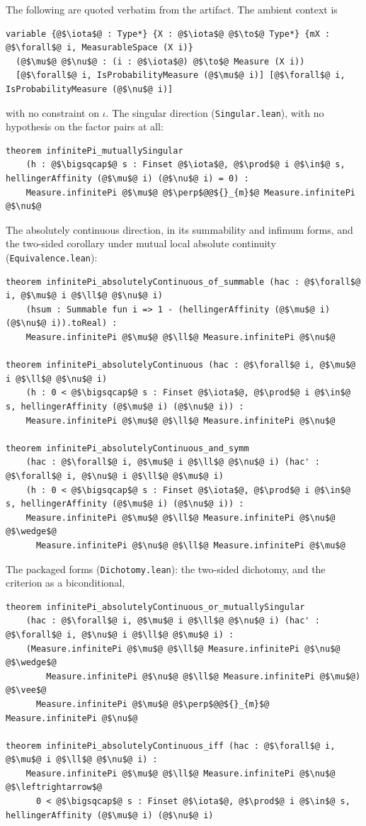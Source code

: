\documentclass[a4paper,UKenglish,autoref,thm-restate]{lipics-v2021}
\begin{document}
The following are quoted verbatim from the artifact. The ambient context is
\begin{lstlisting}
variable {@$\iota$@ : Type*} {X : @$\iota$@ @$\to$@ Type*} {mX : @$\forall$@ i, MeasurableSpace (X i)}
  (@$\mu$@ @$\nu$@ : (i : @$\iota$@) @$\to$@ Measure (X i))
  [@$\forall$@ i, IsProbabilityMeasure (@$\mu$@ i)] [@$\forall$@ i, IsProbabilityMeasure (@$\nu$@ i)]
\end{lstlisting}
with no constraint on $\iota$. The singular direction
(\texttt{Singular.lean}), with no hypothesis on the factor pairs at all:
\begin{lstlisting}
theorem infinitePi_mutuallySingular
    (h : @$\bigsqcap$@ s : Finset @$\iota$@, @$\prod$@ i @$\in$@ s, hellingerAffinity (@$\mu$@ i) (@$\nu$@ i) = 0) :
    Measure.infinitePi @$\mu$@ @$\perp$@@${}_{m}$@ Measure.infinitePi @$\nu$@
\end{lstlisting}
The absolutely continuous direction, in its summability and infimum forms, and
the two-sided corollary under mutual local absolute continuity
(\texttt{Equivalence.lean}):
\begin{lstlisting}
theorem infinitePi_absolutelyContinuous_of_summable (hac : @$\forall$@ i, @$\mu$@ i @$\ll$@ @$\nu$@ i)
    (hsum : Summable fun i => 1 - (hellingerAffinity (@$\mu$@ i) (@$\nu$@ i)).toReal) :
    Measure.infinitePi @$\mu$@ @$\ll$@ Measure.infinitePi @$\nu$@

theorem infinitePi_absolutelyContinuous (hac : @$\forall$@ i, @$\mu$@ i @$\ll$@ @$\nu$@ i)
    (h : 0 < @$\bigsqcap$@ s : Finset @$\iota$@, @$\prod$@ i @$\in$@ s, hellingerAffinity (@$\mu$@ i) (@$\nu$@ i)) :
    Measure.infinitePi @$\mu$@ @$\ll$@ Measure.infinitePi @$\nu$@

theorem infinitePi_absolutelyContinuous_and_symm
    (hac : @$\forall$@ i, @$\mu$@ i @$\ll$@ @$\nu$@ i) (hac' : @$\forall$@ i, @$\nu$@ i @$\ll$@ @$\mu$@ i)
    (h : 0 < @$\bigsqcap$@ s : Finset @$\iota$@, @$\prod$@ i @$\in$@ s, hellingerAffinity (@$\mu$@ i) (@$\nu$@ i)) :
    Measure.infinitePi @$\mu$@ @$\ll$@ Measure.infinitePi @$\nu$@ @$\wedge$@
      Measure.infinitePi @$\nu$@ @$\ll$@ Measure.infinitePi @$\mu$@
\end{lstlisting}
The packaged forms (\texttt{Dichotomy.lean}): the two-sided dichotomy, and
the criterion as a biconditional,
\begin{lstlisting}
theorem infinitePi_absolutelyContinuous_or_mutuallySingular
    (hac : @$\forall$@ i, @$\mu$@ i @$\ll$@ @$\nu$@ i) (hac' : @$\forall$@ i, @$\nu$@ i @$\ll$@ @$\mu$@ i) :
    (Measure.infinitePi @$\mu$@ @$\ll$@ Measure.infinitePi @$\nu$@ @$\wedge$@
        Measure.infinitePi @$\nu$@ @$\ll$@ Measure.infinitePi @$\mu$@) @$\vee$@
      Measure.infinitePi @$\mu$@ @$\perp$@@${}_{m}$@ Measure.infinitePi @$\nu$@

theorem infinitePi_absolutelyContinuous_iff (hac : @$\forall$@ i, @$\mu$@ i @$\ll$@ @$\nu$@ i) :
    Measure.infinitePi @$\mu$@ @$\ll$@ Measure.infinitePi @$\nu$@ @$\leftrightarrow$@
      0 < @$\bigsqcap$@ s : Finset @$\iota$@, @$\prod$@ i @$\in$@ s, hellingerAffinity (@$\mu$@ i) (@$\nu$@ i)
\end{lstlisting}
\end{document}
